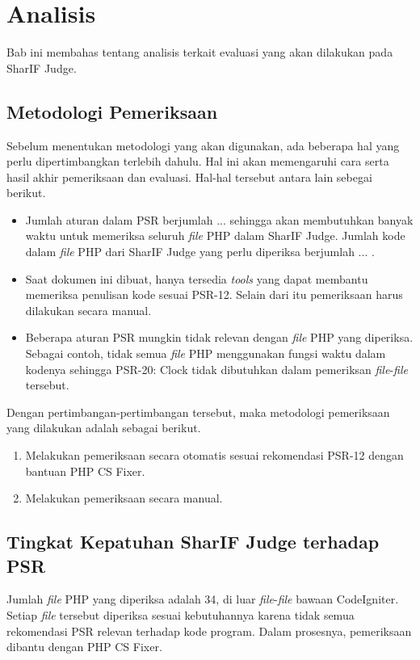 \chapter{Analisis}
\label{chap:analisis}
Bab ini membahas tentang analisis terkait evaluasi yang akan dilakukan pada SharIF Judge. 


\section{Metodologi Pemeriksaan}
\label{sec:metodologi}

Sebelum menentukan metodologi yang akan digunakan, ada beberapa hal yang perlu dipertimbangkan terlebih dahulu. Hal ini akan memengaruhi cara serta hasil akhir pemeriksaan dan evaluasi. Hal-hal tersebut antara lain sebegai berikut.
\begin{itemize}
	\item Jumlah aturan dalam PSR berjumlah ... sehingga akan membutuhkan banyak waktu untuk memeriksa seluruh \textit{file} PHP dalam SharIF Judge. Jumlah kode dalam \textit{file} PHP dari SharIF Judge yang perlu diperiksa berjumlah ... .
	\item Saat dokumen ini dibuat, hanya tersedia \textit{tools} yang dapat membantu memeriksa penulisan kode sesuai PSR-12. Selain dari itu pemeriksaan harus dilakukan secara manual.
	\item Beberapa aturan PSR mungkin tidak relevan dengan \textit{file} PHP yang diperiksa. Sebagai contoh, tidak semua \textit{file} PHP menggunakan fungsi waktu  dalam kodenya sehingga PSR-20: Clock tidak dibutuhkan dalam pemeriksan \textit{file}-\textit{file} tersebut.
\end{itemize} 

Dengan pertimbangan-pertimbangan tersebut, maka metodologi pemeriksaan yang dilakukan adalah sebagai berikut.
\begin{enumerate}
	\item Melakukan pemeriksaan secara otomatis sesuai rekomendasi PSR-12 dengan bantuan PHP CS Fixer.
	\item Melakukan pemeriksaan secara manual. 
\end{enumerate}


\section{Tingkat Kepatuhan SharIF Judge terhadap PSR}
\label{sec:tingkat_patuh}
Jumlah \textit{file} PHP yang diperiksa adalah 34, di luar \textit{file}-\textit{file} bawaan CodeIgniter. Setiap \textit{file} tersebut diperiksa sesuai kebutuhannya karena tidak semua rekomendasi PSR relevan terhadap kode program. Dalam prosesnya, pemeriksaan dibantu dengan PHP CS Fixer. 


